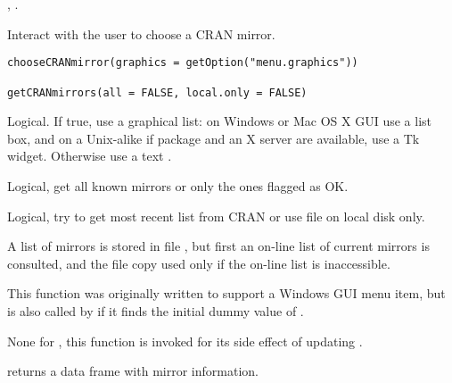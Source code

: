 %
\begin{SeeAlso}\relax
{}, .
\end{SeeAlso}
%
\begin{Description}\relax
Interact with the user to choose a CRAN mirror.
\end{Description}
%
\begin{Usage}
\begin{verbatim}
chooseCRANmirror(graphics = getOption("menu.graphics"))

getCRANmirrors(all = FALSE, local.only = FALSE)
\end{verbatim}
\end{Usage}
%
\begin{Arguments}
\begin{ldescription}
\item[\code{graphics}] Logical. If true, use a graphical list: on Windows or
Mac OS X GUI use a list box, and on a Unix-alike if package
 and an X server are available, use a Tk
widget. Otherwise use a text .

\item[\code{all}] Logical, get all known mirrors or only the ones flagged as OK.
\item[\code{local.only}] Logical, try to get most recent list from CRAN or
use file on local disk only.
\end{ldescription}
\end{Arguments}
%
\begin{Details}\relax
A list of mirrors is stored in file
, but first an on-line list of
current mirrors is consulted, and the file copy used only if the
on-line list is inaccessible.

This function was originally written to support a Windows GUI menu
item, but is also called by  if it finds the
initial dummy value of .
\end{Details}
%
\begin{Value}
None for , this function is invoked for its
side effect of updating .

 returns a data frame with mirror information.
\end{Value}
